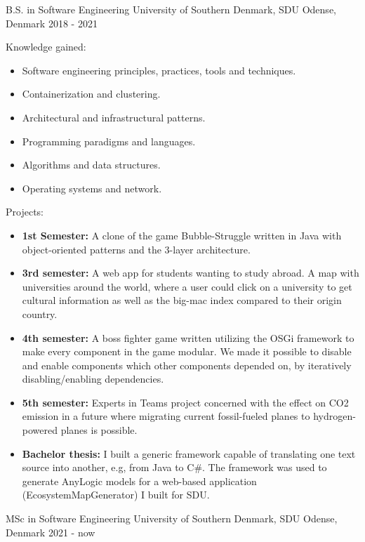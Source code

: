 \begin{cventries}
\cventry
{B.S. in Software Engineering} %
{University of Southern Denmark, SDU} %
{Odense, Denmark} %
{2018 - 2021} %
{
  \begin{cvitems} %
    \item {Knowledge gained: }
    \begin{itemize} %
      \item {Software engineering principles, practices, tools and techniques.}
      \item {Containerization and clustering.}
      \item {Architectural and infrastructural patterns.}
      \item {Programming paradigms and languages.}
      \item {Algorithms and data structures.}
      \item {Operating systems and network.}
    \end{itemize}
    \item {Projects: }
    \begin{itemize} %
      \item {\textbf{1st Semester:} A clone of the game Bubble-Struggle written in Java with object-oriented patterns and the 3-layer architecture.}
      \item {\textbf{3rd semester:} A web app for students wanting to study abroad. A map with universities around the world, where a user could click on a university to get cultural information as well as the big-mac index compared to their origin country.}
      \item {\textbf{4th semester:} A boss fighter game written utilizing the OSGi framework to make every component in the game modular. We made it possible to disable and enable components which other components depended on, by iteratively disabling/enabling dependencies.}
      \item {\textbf{5th semester:} Experts in Teams project concerned with the effect on CO2 emission in a future where migrating current fossil-fueled planes to hydrogen-powered planes is possible. }
      \item {\textbf{Bachelor thesis:} I built a generic framework capable of translating one text source into another, e.g, from Java to C\#. The framework was used to generate AnyLogic models for a web-based application (EcosystemMapGenerator) I built for SDU.}
    \end{itemize}
  \end{cvitems}
}

\cventry
{MSc in Software Engineering} %
{University of Southern Denmark, SDU} %
{Odense, Denmark} %
{2021 - now} %
{}
\end{cventries}
